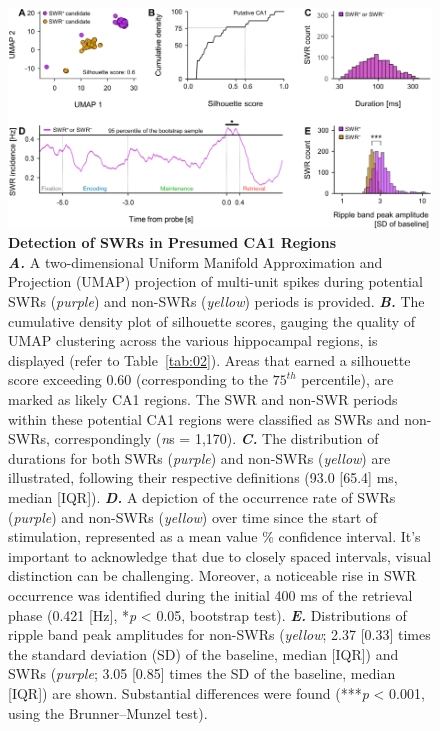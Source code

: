 \documentclass[final,3p,times,twocolumn]{elsarticle}
\begin{document}
        \clearpage
        \begin{figure}[ht]
        	\centering
            \includegraphics[width=1\textwidth]{./src/figures/.png/Figure_ID_04.png}
        	\caption{\textbf{Detection of SWRs in Presumed CA1 Regions}
\smallskip
\\
\textbf{\textit{A.}} A two-dimensional Uniform Manifold Approximation and Projection (UMAP) projection of multi-unit spikes during potential SWRs (\textit{purple}) and non-SWRs (\textit{yellow}) periods is provided\cite{mcinnes_umap_2018}. \textbf{\textit{B.}} The cumulative density plot of silhouette scores, gauging the quality of UMAP clustering across the various hippocampal regions, is displayed (refer to Table~\ref{tab:02}). Areas that earned a silhouette score exceeding 0.60 (corresponding to the $75^{th}$ percentile), are marked as likely CA1 regions. The SWR and non-SWR periods within these potential CA1 regions were classified as SWRs and non-SWRs, correspondingly (\textit{n}s = 1,170)\cite{rousseeuw_silhouettes_1987}. \textbf{\textit{C.}} The distribution of durations for both SWRs (\textit{purple}) and non-SWRs (\textit{yellow}) are illustrated, following their respective definitions (93.0 [65.4] ms, median [IQR])\cite{girardeau_selective_2009}\cite{norman_hippocampal_2021}. \textbf{\textit{D.}} A depiction of the occurrence rate of SWRs (\textit{purple}) and non-SWRs (\textit{yellow}) over time since the start of stimulation, represented as a mean value \% confidence interval. It's important to acknowledge that due to closely spaced intervals, visual distinction can be challenging. Moreover, a noticeable rise in SWR occurrence was identified during the initial 400 ms of the retrieval phase (0.421 [Hz], *\textit{p} < 0.05, bootstrap test)\cite{buzsaki_hippocampal_2015}\cite{ego-stengel_disruption_2010}\cite{fernandez-ruiz_long-duration_2019}. \textbf{\textit{E.}} Distributions of ripple band peak amplitudes for non-SWRs (\textit{yellow}; 2.37 [0.33] times the standard deviation (SD) of the baseline, median [IQR]) and SWRs (\textit{purple}; 3.05 [0.85] times the SD of the baseline, median [IQR]) are shown. Substantial differences were found (***\textit{p} < 0.001, using the Brunner--Munzel test)\cite{norman_hippocampal_2019}\cite{diba_forward_2007}\cite{liu_consensus_2022}.
}
        	\label{fig:04}
        \end{figure}
\end{document}
